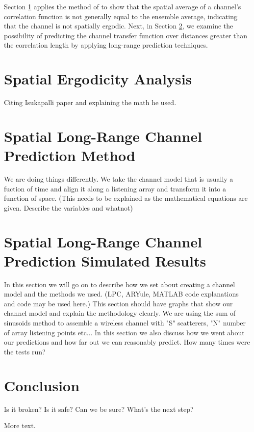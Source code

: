 \documentclass[11pt]{article} %
\begin{document}
Section \ref{ergodicity} applies the method of \cite{isukapalli} to show that the spatial average of a channel's correlation function is not generally equal to the ensemble average, indicating that the channel is not spatially ergodic. Next, in Section \ref{prediction}, we examine the possibility of predicting the channel transfer function over distances greater than the correlation length by applying long-range prediction techniques.


\section{Spatial Ergodicity Analysis}\label{ergodicity}

Citing Isukapalli paper and explaining the math he used.

\section{Spatial Long-Range Channel Prediction Method}\label{prediction}

We are doing things differently. We take the channel model that is usually a fuction of time and align it along a listening array and transform it into a function of space. (This needs to be explained as the mathematical equations are given. Describe the variables and whatnot)

\section{Spatial Long-Range Channel Prediction Simulated Results}

In this section we will go on to describe how we set about creating a channel model and the methods we used. (LPC, ARYule, MATLAB code explanations and code may be used here.) This section should have graphs that show our channel model and explain the methodology clearly. We are using the sum of sinusoids method to assemble a wireless channel with "S" scatterers, "N" number of array listening points etc... In this section we also discuss how we went about our predictions and how far out we can reasonably predict. How many times were the tests run?

\section{Conclusion}
Is it broken? Is it safe? Can we be sure? What's the next step?


More text.
\end{document}
